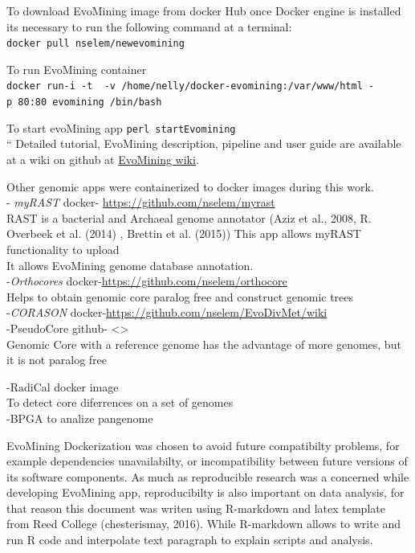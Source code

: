 \documentclass[12pt,twoside]{reedthesis}
\begin{document}
  To download EvoMining image from docker Hub once Docker engine is
  installed its necessary to run the following command at a terminal:\\
  \texttt{docker\ pull\ nselem/newevomining}
  
  To run EvoMining container\\
  \texttt{docker\ run-i\ -t\ \ -v\ /home/nelly/docker-evomining:/var/www/html\ -p\ 80:80\ evomining\ /bin/bash}
  
  To start evoMining app \texttt{perl\ startEvomining}\\
  `` Detailed tutorial, EvoMining description, pipeline and user guide are
  available at a wiki on github at
  \href{https://github.com/nselem/EvoMining/wiki}{EvoMining wiki}.
  
  Other genomic apps were containerized to docker images during this
  work.\\
  - \emph{myRAST} docker- \url{https://github.com/nselem/myrast}\\
  RAST is a bacterial and Archaeal genome annotator (Aziz et al., 2008, R.
  Overbeek et al. (2014) , Brettin et al. (2015)) This app allows myRAST
  functionality to upload\\
  It allows EvoMining genome database annotation.\\
  -\emph{Orthocores} docker-\url{https://github.com/nselem/orthocore}\\
  Helps to obtain genomic core paralog free and construct genomic trees\\
  -\emph{CORASON} docker-\url{https://github.com/nselem/EvoDivMet/wiki}\\
  -PseudoCore github- \textless{}\textgreater{}\\
  Genomic Core with a reference genome has the advantage of more genomes,
  but it is not paralog free
  
  -RadiCal docker image\\
  To detect core diferrences on a set of genomes\\
  -BPGA to analize pangenome
  
  EvoMining Dockerization was chosen to avoid future compatibilty
  problems, for example dependencies unavailabilty, or incompatibility
  between future versions of its software components. As much as
  reproducible research was a concerned while developing EvoMining app,
  reproducibilty is also important on data analysis, for that reason this
  document was writen using R-markdown and latex template from Reed
  College (chesterismay, 2016). While R-markdown allows to write and run R
  code and interpolate text paragraph to explain scripts and analysis.
  
\end{document}
